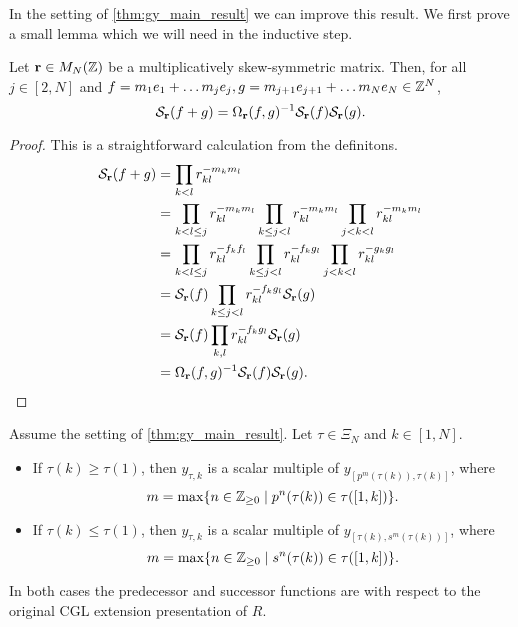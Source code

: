 In the setting of \cref{thm:gy_main_result} we can improve this result. We first prove
a small lemma which we will need in the inductive step.
\begin{lemma}\label{lem:symmetrization_of_sum}
	Let $\mathbf{r} \in M_N(\mathbb{Z})$ be a multiplicatively skew-symmetric matrix. Then, for all $j \in [2, N]$ and $f = m_1 e_1 + \dots m_j e_j, g = m_{j+1} e_{j+1} + \dots m_{N} e_N \in \mathbb{Z}^N$,
	\begin{equation*}
		\mathcal{S}_{\mathbf{r}}(f+g) = \Omega_{\mathbf{r}}(f,g)^{-1} \mathcal{S}_{\mathbf{r}}(f)\mathcal{S}_{\mathbf{r}}(g).
	\end{equation*}
\end{lemma}
\begin{proof}
	This is a straightforward calculation from the definitons.
	\begin{align*}
		\mathcal{S}_{\mathbf{r}}(f+g)
		 & = \prod_{k < l}r_{kl}^{-m_k m_l}                                                                                 \\
		 & = \prod_{k < l \leq j}r_{kl}^{-m_k m_l} \prod_{k \leq j < l}r_{kl}^{-m_k m_l} \prod_{j < k < l}r_{kl}^{-m_k m_l} \\
		 & = \prod_{k < l \leq j}r_{kl}^{-f_k f_l} \prod_{k \leq j < l}r_{kl}^{-f_k g_l} \prod_{j < k < l}r_{kl}^{-g_k g_l} \\
		 & = \mathcal{S}_{\mathbf{r}}(f) \prod_{k \leq j < l}r_{kl}^{-f_k g_l} \mathcal{S}_{\mathbf{r}}(g)                                            \\
		 & = \mathcal{S}_{\mathbf{r}}(f) \prod_{k, l}r_{kl}^{-f_k g_l} \mathcal{S}_{\mathbf{r}}(g)                                                    \\
		 & = \Omega_{\mathbf{r}}(f,g)^{-1} \mathcal{S}_{\mathbf{r}}(f) \mathcal{S}_{\mathbf{r}}(g).
	\end{align*}
\end{proof}
\begin{proposition}\label{prop:y_tau_is_y_bracket}
	Assume the setting of \cref{thm:gy_main_result}. Let $\tau \in \Xi_N$ and $k \in [1, N]$.
	\begin{itemize}
		\item If $\tau(k) \geq \tau(1)$, then $y_{\tau,k}$ is a scalar multiple of $y_{[p^m(\tau(k)),
							      \tau(k)]}$, where
		      \begin{equation*}
			      m = \max\{n \in \mathbb{Z}_{\geq 0} \mid p^n(\tau(k)) \in \tau([1,k])\}.
		      \end{equation*}
		\item If $\tau(k) \leq \tau(1)$, then $y_{\tau,k}$ is a scalar multiple of $y_{[\tau(k),s^m(
							      \tau(k))]}$, where
		      \begin{equation*}
			      m = \max\{n \in \mathbb{Z}_{\geq 0} \mid s^n(\tau(k)) \in \tau([1,k])\}.
		      \end{equation*}
	\end{itemize}
	In both cases the predecessor and successor functions are with respect to the original
	CGL extension presentation of $R$.
\end{proposition}
